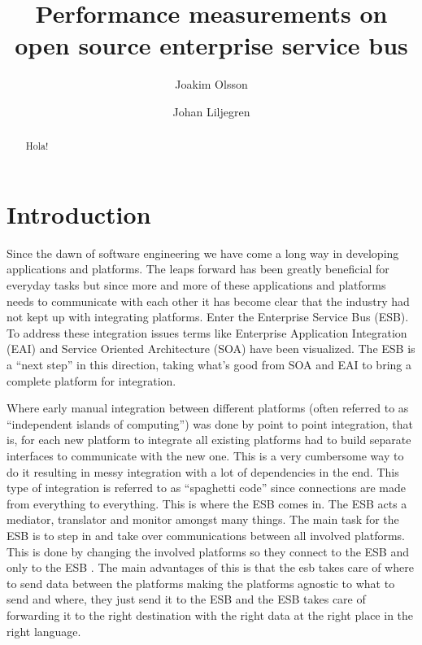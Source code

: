 \documentclass{llncs}
\title{Performance measurements on open source enterprise service bus}
\author{Joakim Olsson \inst{1} \and Johan Liljegren\inst{1}}
\institute{
	Blekinge Institute of Technology \\
	\email{laggmonkei@gmail.com}, \email{datanizze@gmail.com}
}
\begin{document}
\maketitle
\begin{abstract}
Hola!
\end{abstract}

\section{Introduction} %

Since the dawn of software engineering we have come a long way in developing applications and platforms. The leaps forward has been greatly beneficial for everyday tasks but since more and more of these applications and platforms needs to communicate with each other it has become clear that the industry had not kept up with integrating platforms. Enter the Enterprise Service Bus (ESB). To address these integration issues terms like Enterprise Application Integration (EAI) and Service Oriented Architecture (SOA) have been visualized. The ESB is a ``next step'' in this direction, taking what's good from SOA and EAI to bring a complete platform for integration.

Where early manual integration between different platforms (often referred to as ``independent islands of computing'') was done by point to point integration, that is, for each new platform to integrate all existing platforms had to build separate interfaces to communicate with the new one. This is a very cumbersome way to do it resulting in messy integration with a lot of dependencies in the end. This type of integration is referred to as ``spaghetti code'' since connections are made from everything to everything. This is where the ESB comes in. The ESB acts a mediator, translator and monitor amongst many things. The main task for the ESB is to step in and take over communications between all involved platforms. This is done by changing the involved platforms so they connect to the ESB and only to the ESB \cite{Sanjay2011}. The main advantages of this is that the esb takes care of where to send data between the platforms making the platforms agnostic to what to send and where, they just send it to the ESB and the ESB takes care of forwarding it to the right destination with the right data at the right place in the right language.
\end{document}
